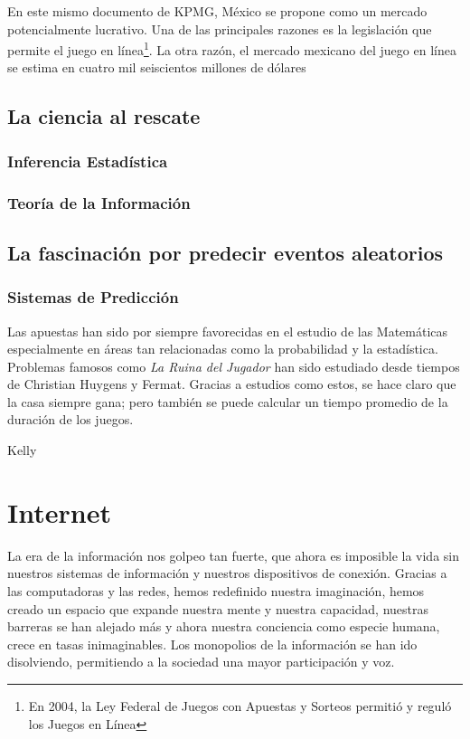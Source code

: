 En este mismo documento de KPMG\cite{kpmgOnlineGaming}, México se propone como un mercado potencialmente lucrativo. Una de las principales razones es la legislación que permite el juego en línea\footnote{En 2004, la Ley Federal de Juegos con Apuestas y Sorteos permitió y reguló los Juegos en Línea}. La otra razón, el mercado mexicano del juego en línea se estima en cuatro mil seiscientos millones de dólares\cite{yogonet}


\subsection{La ciencia al rescate}
\subsubsection{Inferencia Estadística}
\subsubsection{Teoría de la Información}
\subsection{La fascinación por predecir eventos aleatorios}
\subsubsection{Sistemas de Predicción}

Las apuestas han sido por siempre favorecidas en el estudio de las Matemáticas especialmente en áreas tan relacionadas como la probabilidad y la estadística.
Problemas famosos como \emph{La Ruina del Jugador}\cite[p.~95-99]{ross2006first} han sido estudiado desde tiempos de Christian Huygens y Fermat. Gracias a estudios como estos, se hace claro que la casa siempre gana; pero también se puede calcular un tiempo promedio de la duración de los juegos.

Kelly

\section{Internet}
La era de la información nos golpeo tan fuerte, que ahora es imposible la vida sin nuestros sistemas de información y nuestros dispositivos de conexión. Gracias a las computadoras y las redes, hemos redefinido nuestra imaginación, hemos creado un espacio que expande nuestra mente y nuestra capacidad, nuestras barreras se han alejado más y ahora nuestra conciencia como especie humana, crece en tasas inimaginables. Los monopolios de la información se han ido disolviendo, permitiendo a la sociedad una mayor participación y voz.

